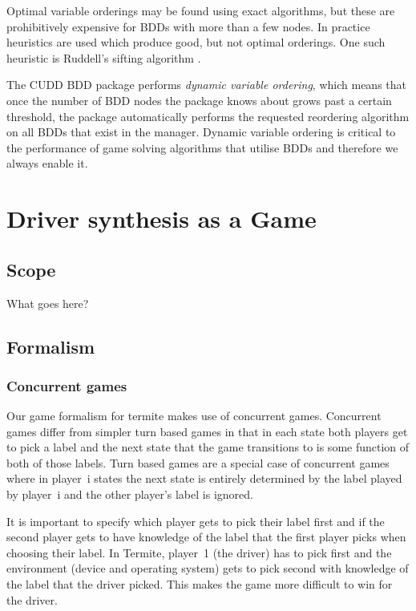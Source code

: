 \documentclass[a4paper,twoside,openright,11pt]{book}
\theoremstyle{definition}
\begin{document}
Optimal variable orderings may be found using exact algorithms, but these are prohibitively expensive for BDDs with more than a few nodes. In practice heuristics are used which produce good, but not optimal orderings. One such heuristic is Ruddell's sifting algorithm \cite{sifting}.

The CUDD BDD package performs \emph{dynamic variable ordering}, which means that once the number of BDD nodes the package knows about grows past a certain threshold, the package automatically performs the requested reordering algorithm on all BDDs that exist in the manager. Dynamic variable ordering is critical to the performance of game solving algorithms that utilise BDDs and therefore we always enable it.

\chapter{Driver synthesis as a Game}

\section{Scope}
What goes here?

\section{Formalism}

\subsection{Concurrent games}

Our game formalism for termite makes use of concurrent games. Concurrent games differ from simpler turn based games in that in each state both players get to pick a label and the next state that the game transitions to is some function of both of those labels. Turn based games are a special case of concurrent games where in player~i states the next state is entirely determined by the label played by player~i and the other player's label is ignored. 

It is important to specify which player gets to pick their label first and if the second player gets to have knowledge of the label that the first player picks when choosing their label. In Termite, player~1 (the driver) has to pick first and the environment (device and operating system) gets to pick second with knowledge of the label that the driver picked. This makes the game more difficult to win for the driver.
\end{document}
